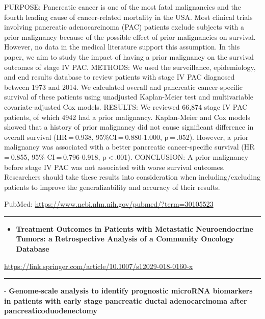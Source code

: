 \documentclass[]{article}
\providecommand{\tightlist}{%
  \setlength{\itemsep}{0pt}\setlength{\parskip}{0pt}}
\begin{document}
PURPOSE: Pancreatic cancer is one of the most fatal malignancies and the
fourth leading cause of cancer-related mortality in the USA. Most
clinical trials involving pancreatic adenocarcinoma (PAC) patients
exclude subjects with a prior malignancy because of the possible effect
of prior malignancies on survival. However, no data in the medical
literature support this assumption. In this paper, we aim to study the
impact of having a prior malignancy on the survival outcomes of stage IV
PAC. METHODS: We used the surveillance, epidemiology, and end results
database to review patients with stage IV PAC diagnosed between 1973 and
2014. We calculated overall and pancreatic cancer-specific survival of
these patients using unadjusted Kaplan-Meier test and multivariable
covariate-adjusted Cox models. RESULTS: We reviewed 66,874 stage IV PAC
patients, of which 4942 had a prior malignancy. Kaplan-Meier and Cox
models showed that a history of prior malignancy did not cause
significant difference in overall survival (HR = 0.938,
95\%CI = 0.880-1.000, p = .052). However, a prior malignancy was
associated with a better pancreatic cancer-specific survival
(HR = 0.855, 95\% CI = 0.796-0.918, p \textless{} .001). CONCLUSION: A
prior malignancy before stage IV PAC was not associated with worse
survival outcomes. Researchers should take these results into
consideration when including/excluding patients to improve the
generalizability and accuracy of their results.

PubMed: \url{https://www.ncbi.nlm.nih.gov/pubmed/?term=30105523}

{}

{}

\begin{center}\rule{0.5\linewidth}{\linethickness}\end{center}

\begin{itemize}
\tightlist
\item
  \textbf{Treatment Outcomes in Patients with Metastatic Neuroendocrine
  Tumors: a Retrospective Analysis of a Community Oncology Database}
\end{itemize}

\url{https://link.springer.com/article/10.1007/s12029-018-0160-x}

\begin{center}\rule{0.5\linewidth}{\linethickness}\end{center}

 - \textbf{Genome-scale analysis to identify prognostic microRNA
biomarkers in patients with early stage pancreatic ductal adenocarcinoma
after pancreaticoduodenectomy}
\end{document}
